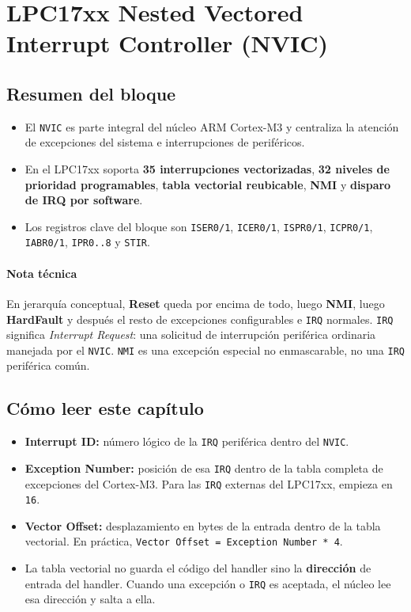 \setcounter{section}{5}
\section{LPC17xx Nested Vectored Interrupt Controller (NVIC)}

\subsection{Resumen del bloque}
\begin{itemize}
  \item El \texttt{NVIC} es parte integral del n\'ucleo ARM Cortex-M3 y centraliza la atenci\'on de excepciones del sistema e interrupciones de perif\'ericos.
  \item En el LPC17xx soporta \textbf{35 interrupciones vectorizadas}, \textbf{32 niveles de prioridad programables}, \textbf{tabla vectorial reubicable}, \textbf{NMI} y \textbf{disparo de IRQ por software}.
  \item Los registros clave del bloque son \texttt{ISER0/1}, \texttt{ICER0/1}, \texttt{ISPR0/1}, \texttt{ICPR0/1}, \texttt{IABR0/1}, \texttt{IPR0..8} y \texttt{STIR}.
\end{itemize}

\paragraph{Nota t\'ecnica}
En jerarqu\'ia conceptual, \textbf{Reset} queda por encima de todo, luego \textbf{NMI}, luego \textbf{HardFault} y despu\'es el resto de excepciones configurables e \texttt{IRQ} normales. \texttt{IRQ} significa \textit{Interrupt Request}: una solicitud de interrupci\'on perif\'erica ordinaria manejada por el \texttt{NVIC}. \texttt{NMI} es una excepci\'on especial no enmascarable, no una \texttt{IRQ} perif\'erica com\'un.

\subsection{C\'omo leer este cap\'itulo}
\begin{itemize}
  \item \textbf{Interrupt ID:} n\'umero l\'ogico de la \texttt{IRQ} perif\'erica dentro del \texttt{NVIC}.
  \item \textbf{Exception Number:} posici\'on de esa \texttt{IRQ} dentro de la tabla completa de excepciones del Cortex-M3. Para las \texttt{IRQ} externas del LPC17xx, empieza en \texttt{16}.
  \item \textbf{Vector Offset:} desplazamiento en bytes de la entrada dentro de la tabla vectorial. En pr\'actica, \texttt{Vector Offset = Exception Number * 4}.
  \item La tabla vectorial no guarda el c\'odigo del handler sino la \textbf{direcci\'on} de entrada del handler. Cuando una excepci\'on o \texttt{IRQ} es aceptada, el n\'ucleo lee esa direcci\'on y salta a ella.
\end{itemize}

